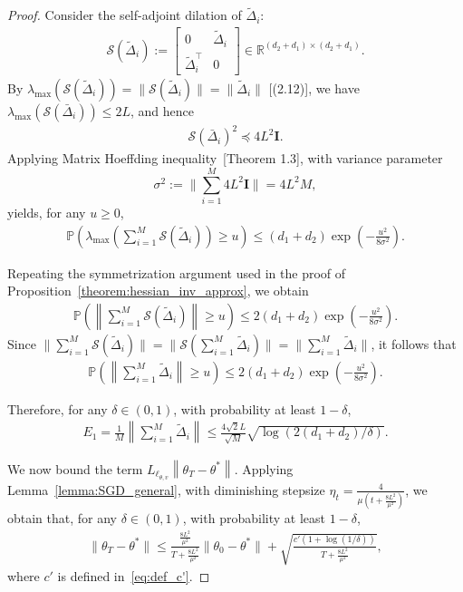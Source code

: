 \documentclass[11 pt]{article}
\begin{document}
\begin{proof}
Consider the self-adjoint dilation of $\tilde{\Delta}_i$: 
\begin{align*}
\mathscr{S}(\tilde{\Delta}_i) := 
\begin{bmatrix}
0 & \tilde{\Delta}_i \\
\tilde{\Delta}_i^\top & 0
\end{bmatrix}\in \mathbb{R}^{(d_2+d_1)\times (d_2+d_1)}.
\end{align*}
By $\lambda_{\text{max}}(\mathscr{S}(\tilde{\Delta}_i))=\|\mathscr{S}(\tilde{\Delta}_i)\|=\|\tilde{\Delta}_i\|$  \cite{tropp2012user}[(2.12)], we have $\lambda_{\text{max}}(\mathscr{S}(\bar{\Delta}_i))\leq 2L$, and hence
\begin{align*}
    \mathscr{S}(\bar{\Delta}_i)^2 \preceq 4L^2\mathbf{I}.
\end{align*}
Applying Matrix Hoeffding inequality~\cite{tropp2012user}[Theorem 1.3], with variance parameter 
\[
\sigma^2:=\|\sum_{i=1}^M 4L^2\mathbf{I} \|=4L^2M,
\]
yields, for any $u\geq 0$,
\begin{align*}
    \mathbb{P}\left( \lambda_{\text{max}}\left(\sum_{i=1}^{M}\mathscr{S}(\tilde{\Delta}_i)\right)\geq u\right)\leq (d_1+d_2) \exp\left(-\frac{u^2}{8\sigma^2}\right).
\end{align*}

Repeating the symmetrization argument used in the proof of Proposition~\ref{theorem:hessian_inv_approx}, we obtain
\begin{align*}
    \mathbb{P}\left( \left\| \sum_{i=1}^{M}\mathscr{S}(\tilde{\Delta}_i) \right\|\geq u\right)\leq 2(d_1+d_2) \exp\left(-\frac{u^2}{8\sigma^2}\right).
\end{align*}
Since $\| \sum_{i=1}^{M}\mathscr{S}(\tilde{\Delta}_i)\|=\|\mathscr{S}(\sum_{i=1}^{M}\tilde{\Delta}_i)\|=\|\sum_{i=1}^{M} \tilde{\Delta}_i\|$, it follows that
\begin{align*}
    \mathbb{P}\left( \left\| \sum_{i=1}^{M}\tilde{\Delta}_i \right\|\geq u\right)\leq 2(d_1+d_2) \exp\left(-\frac{u^2}{8\sigma^2}\right).
\end{align*}

Therefore, for any $\delta\in(0,1)$, with probability at least $1-\delta$, 
\begin{align*}
E_1=\frac1M\left\|\sum_{i=1}^{M}\tilde{\Delta}_i\right\| \leq \frac{4\sqrt{2}L}{\sqrt{M}} \sqrt{\log\left(2(d_1+d_2)/\delta\right)}.
\end{align*}

We now bound the term $L_{\ell_{\theta,v}}\left\|\theta_T-\theta^*\right\|$. Applying Lemma~\ref{lemma:SGD_general}, with diminishing stepsize $\displaystyle \eta_t=\frac{4}{\mu(t+\frac{8L^2}{\mu^2})}$, we obtain that, for any $\delta\in(0,1)$, with probability at least $1-\delta$,
\begin{align*}
    \|\theta_T-\theta^*\|\leq \frac{\frac{8L^2}{\mu^2}}{T+\frac{8L^2}{\mu^2}}\|\theta_0-\theta^*\|+\sqrt{\frac{c'(1+\log(1/\delta))}{T+\frac{8L^2}{\mu^2}}},
\end{align*}
where $c'$ is defined in~\eqref{eq:def_c'}.   



\end{proof}
\end{document}
